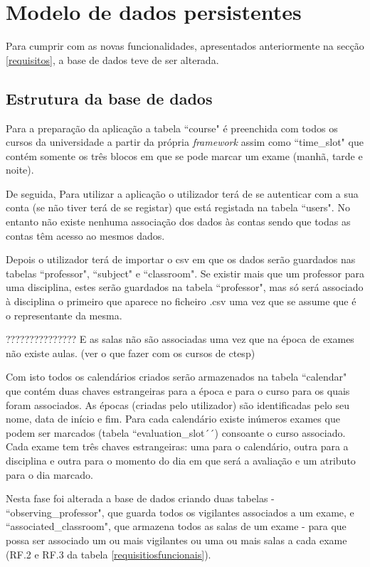 \documentclass[12pt, twoside]{report}
\begin{document}
	

	
	
	\chapter{Modelo de dados persistentes}
	
		Para cumprir com as novas funcionalidades, apresentados anteriormente na secção \ref{requisitos}, a base de dados teve de ser alterada. 
	
	\section{Estrutura da base de dados}
	
	Para a preparação da aplicação a tabela ``course" é preenchida com todos os cursos da universidade a partir da própria \textit{framework} assim como ``time\_slot" que contém somente os três blocos em que se pode marcar um exame (manhã, tarde e noite).
	
	De seguida, Para utilizar a aplicação o utilizador terá de se autenticar com a sua conta (se não tiver terá de se registar) que está registada na tabela ``users". No entanto não existe nenhuma associação dos dados às contas sendo que todas as contas têm acesso ao mesmos dados.
	
	Depois o utilizador terá de importar o csv em que os dados serão guardados nas tabelas ``professor", ``subject" e ``classroom". Se existir mais que um professor para uma disciplina, estes serão guardados na tabela ``professor", mas só será associado à disciplina o primeiro que aparece no ficheiro .csv uma vez que se assume que é o representante da mesma.
	
	???????????????
	E as salas não são associadas uma vez que na época de exames não existe aulas. (ver o que fazer com os cursos de ctesp) 
	
	Com isto todos os calendários criados serão armazenados na tabela ``calendar" que contém duas chaves estrangeiras para a época e para o curso para os quais foram associados. As épocas (criadas pelo utilizador) são identificadas pelo seu nome, data de início e fim. Para cada calendário existe inúmeros exames que podem ser marcados (tabela ``evaluation\_slot´´) consoante o curso associado. Cada exame tem três chaves estrangeiras: uma para o calendário, outra para a disciplina e outra para o momento do dia em que será a avaliação e um atributo para o dia marcado.
	
	Nesta fase foi alterada a base de dados criando duas tabelas - ``observing\_professor", que guarda todos os vigilantes associados a um exame, e ``associated\_classroom", que armazena todos as salas de um exame - para que possa ser associado um ou mais vigilantes ou uma ou mais salas a cada exame (RF.2 e RF.3 da tabela \ref{requisitiosfuncionais}).
	
\end{document}

